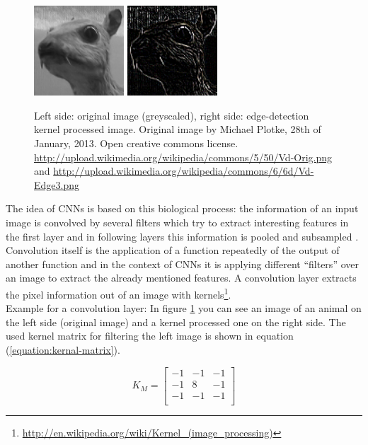 \documentclass[12pt,twoside]{article}
\theoremstyle{plain}
\theoremstyle{definition}
\theoremstyle{remark}
\begin{document}
\begin{figure}
	\centerline{
		\includegraphics[width=0.3\textwidth]{animal-original.png}
		\qquad
		\includegraphics[width=0.3\textwidth]{animal-edge-detection.png}
	}
	{\caption{Left side: original image (greyscaled), right side: edge-detection kernel processed image. Original image by Michael Plotke, 28th of January, 2013. Open creative commons license.
			\protect\url{http://upload.wikimedia.org/wikipedia/commons/5/50/Vd-Orig.png} and \protect\url{http://upload.wikimedia.org/wikipedia/commons/6/6d/Vd-Edge3.png}}\label{fig:animal-edge-detection}}
\end{figure}
The idea of CNNs is based on this biological process: the information of an input image is convolved by several filters which try to extract interesting features in the first layer and in following layers this information is pooled and subsampled \cite{ImangeNetClassificationCNN-Krizhevsky}.
\\
Convolution itself is the application of a function repeatedly of the output of another function and in the context of CNNs it is applying different \enquote{filters} over an image to extract the already mentioned features. A convolution layer extracts the pixel information out of an image with kernels\footnote{\url{http://en.wikipedia.org/wiki/Kernel_(image_processing)}}.
\\
Example for a convolution layer: In figure \ref{fig:animal-edge-detection} you can see an image of an animal on the left side (original image) and a kernel processed one on the right side. The used kernel matrix for filtering the left image is shown in equation (\ref{equation:kernal-matrix}).
\begin{figure}
	\begin{equation}
		\label{equation:kernal-matrix}
		K_M =
		\begin{bmatrix}
		-1 & -1 & -1 \\
		-1 & 8 & -1 \\
		-1 & -1 & -1 \\
		\end{bmatrix}
	\end{equation}
\end{figure}
\end{document}
